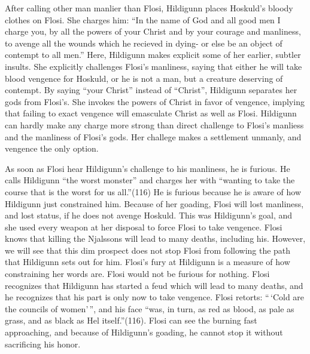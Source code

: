 After calling other man manlier than Flosi, Hildigunn places Hoskuld's
bloody clothes on Flosi. She charges him: ``In the name of God and all
good men I charge you, by all the powers of your Christ and by your
courage and manliness, to avenge all the wounds which he recieved in
dying- or else be an object of contempt to all men.'' Here, Hildigunn
makes explicit some of her earlier, subtler insults. She explicitly
challenges Flosi's manliness, saying that either he will take blood
vengence for Hoskuld, or he is not a man, but a creature deserving of
contempt. By saying ``your Christ'' instead of ``Christ'', Hildigunn
separates her gods from Flosi's. She invokes the powers of Christ in
favor of vengence, implying that failing to exact vengence will
emasculate Christ as well as Flosi. Hildigunn can hardly make any charge
more strong than direct challenge to Flosi's manliess and the manliness
of Flosi's gods. Her challege makes a settlement unmanly, and vengence
the only option.

As soon as Flosi hear Hildigunn's challenge to his manliness, he is
furious. He calls Hildigunn ``the worst monster'' and charges her with
``wanting to take the course that is the worst for us all.''(116) He is
furious because he is aware of how Hildigunn just constrained him.
Because of her goading, Flosi will lost manliness, and lost status, if
he does not avenge Hoskuld. This was Hildigunn's goal, and she used
every weapon at her disposal to force Flosi to take vengence. Flosi
knows that killing the Njalssons will lead to many deaths, including
his. However, we will see that this dim prospect does not stop Flosi
from following the path that Hildigunn sets out for him. Flosi's fury at
Hildigunn is a measure of how constraining her words are. Flosi would
not be furious for nothing. Flosi recognizes that Hildigunn has started
a feud which will lead to many deaths, and he recognizes that his part
is only now to take vengence. Flosi retorts: ``\,`Cold are the councils
of women'\,'', and his face ``was, in turn, as red as blood, as pale as
grass, and as black as Hel itself.''(116). Flosi can see the burning
fast approaching, and because of Hildigunn's goading, he cannot stop it
without sacrificing his honor.

